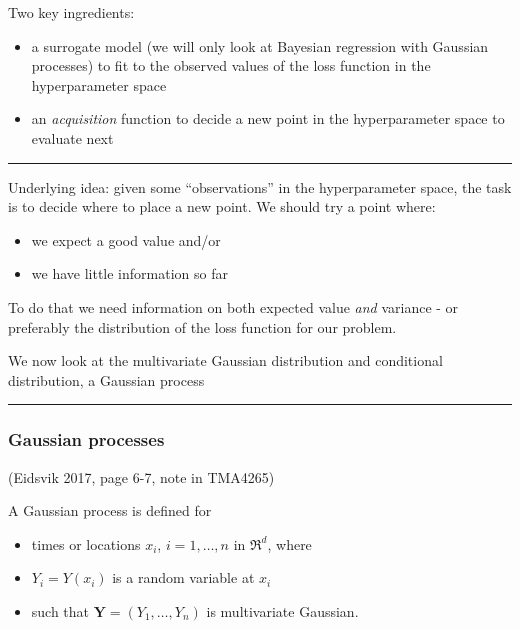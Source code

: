 \documentclass[
  letterpaper,
  DIV=11,
  numbers=noendperiod]{scrartcl}
\providecommand{\tightlist}{%
  \setlength{\itemsep}{0pt}\setlength{\parskip}{0pt}}\usepackage{longtable,booktabs,array}
\begin{document}
Two key ingredients:

\begin{itemize}
\tightlist
\item
  a surrogate model (we will only look at Bayesian regression with
  Gaussian processes) to fit to the observed values of the loss function
  in the hyperparameter space
\item
  an \emph{acquisition} function to decide a new point in the
  hyperparameter space to evaluate next
\end{itemize}

\begin{center}\rule{0.5\linewidth}{0.5pt}\end{center}

Underlying idea: given some ``observations'' in the hyperparameter
space, the task is to decide where to place a new point. We should try a
point where:

\begin{itemize}
\tightlist
\item
  we expect a good value and/or
\item
  we have little information so far
\end{itemize}

To do that we need information on both expected value \emph{and}
variance - or preferably the distribution of the loss function for our
problem.

We now look at the multivariate Gaussian distribution and conditional
distribution, a Gaussian process

\begin{center}\rule{0.5\linewidth}{0.5pt}\end{center}

\hypertarget{gaussian-processes}{%
\subsubsection{Gaussian processes}\label{gaussian-processes}}

(Eidsvik 2017, page 6-7, note in TMA4265)

A Gaussian process is defined for

\begin{itemize}
\tightlist
\item
  times or locations \(x_i\), \(i=1,\ldots,n\) in \(\Re^d\), where
\item
  \(Y_i=Y(x_i)\) is a random variable at \(x_i\)
\item
  such that \({\boldsymbol Y}=(Y_1,\ldots,Y_n)\) is multivariate
  Gaussian.
\end{itemize}
\end{document}
